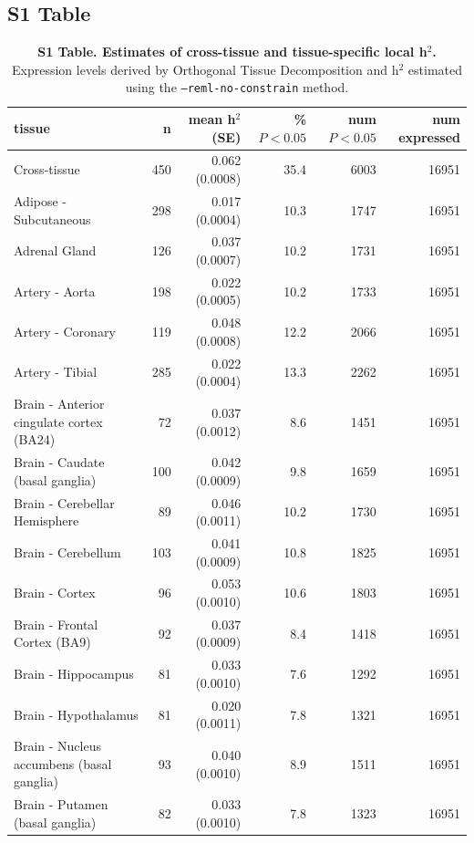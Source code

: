 \documentclass[10pt,letterpaper]{article}
\begin{document}
\subsection*{S1 Table}
\label{S1_Table}
\begin{table}[!ht]
\begin{adjustwidth}{-2.25in}{0in} %
\caption*{{\bf S1 Table. Estimates of cross-tissue and tissue-specific local h$^2$.} Expression levels derived by Orthogonal Tissue Decomposition and h$^2$ estimated using the \texttt{--reml-no-constrain} method.}
\centering
\begin{tabular}{lrrrrr}
  \hline
tissue & n & mean h$^2$ (SE) & \% $P<0.05$ & num $P<0.05$ & num expressed \\ 
  \hline
Cross-tissue & 450 & 0.062 (0.0008) & 35.4 & 6003 & 16951 \\ 
  Adipose - Subcutaneous & 298 & 0.017 (0.0004) & 10.3 & 1747 & 16951 \\ 
  Adrenal Gland & 126 & 0.037 (0.0007) & 10.2 & 1731 & 16951 \\ 
  Artery - Aorta & 198 & 0.022 (0.0005) & 10.2 & 1733 & 16951 \\ 
  Artery - Coronary & 119 & 0.048 (0.0008) & 12.2 & 2066 & 16951 \\ 
  Artery - Tibial & 285 & 0.022 (0.0004) & 13.3 & 2262 & 16951 \\ 
  Brain - Anterior cingulate cortex (BA24) & 72 & 0.037 (0.0012) & 8.6 & 1451 & 16951 \\ 
  Brain - Caudate (basal ganglia) & 100 & 0.042 (0.0009) & 9.8 & 1659 & 16951 \\ 
  Brain - Cerebellar Hemisphere & 89 & 0.046 (0.0011) & 10.2 & 1730 & 16951 \\ 
  Brain - Cerebellum & 103 & 0.041 (0.0009) & 10.8 & 1825 & 16951 \\ 
  Brain - Cortex & 96 & 0.053 (0.0010) & 10.6 & 1803 & 16951 \\ 
  Brain - Frontal Cortex (BA9) & 92 & 0.037 (0.0009) & 8.4 & 1418 & 16951 \\ 
  Brain - Hippocampus & 81 & 0.033 (0.0010) & 7.6 & 1292 & 16951 \\ 
  Brain - Hypothalamus & 81 & 0.020 (0.0011) & 7.8 & 1321 & 16951 \\ 
  Brain - Nucleus accumbens (basal ganglia) & 93 & 0.040 (0.0010) & 8.9 & 1511 & 16951 \\ 
  Brain - Putamen (basal ganglia) & 82 & 0.033 (0.0010) & 7.8 & 1323 & 16951 \\ 

\end{tabular}
\end{adjustwidth}
\end{table}
\end{document}
